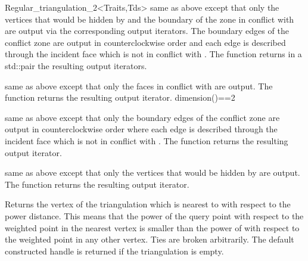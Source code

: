\begin{ccRefClass}{Regular_triangulation_2<Traits,Tds>}
{ same as above except that only the vertices that would be hidden
  by  and the boundary of the zone in conflict with  are
  output via the corresponding output iterators. The boundary edges of
  the conflict zone are output in counterclockwise order and each edge
  is described through the incident face which is not in conflict with
  . The function returns in a std::pair the resulting output
  iterators.}

{same as above except that only the faces in conflict with 
are output. The function returns the resulting output iterator.
\ccPrecond dimension()==2}

{ same as above except that only the boundary edges
of the conflict zone are output in counterclockwise order
where each edge is described  through the incident face
which is not in conflict with .
The function returns the resulting output iterator.}

        {same as above except that only the vertices that would be hidden by  
          are output. The function returns the resulting output iterator.}

{Returns the vertex of the triangulation which is nearest to 
  with respect to the power distance. This means that the power of the
query point  with respect to the weighted point in the nearest
vertex is smaller than the power of  with respect to the
weighted point in any other vertex. Ties are broken arbitrarily. The
default constructed handle is returned if the triangulation is empty.}


\end{ccRefClass}
